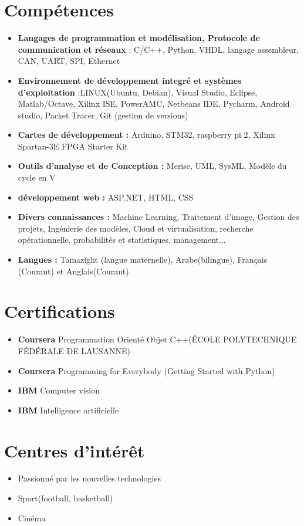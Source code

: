 \documentclass[letterpaper,9pt]{article}
\newcommand{\resumeItem}[2]{
  \item\small{
    {#1} { #2 \vspace{-2pt}}
  }
}
\newcommand{\resumeSubItem}[2]{\resumeItem{\textbf{#1}}{#2}\vspace{-4pt}}
\newcommand{\resumeSubHeadingListStart}{\begin{itemize}[leftmargin=*]}
\newcommand{\resumeSubHeadingListEnd}{\end{itemize}}
\begin{document}
\section{Compétences}
\color{black}
 \resumeSubHeadingListStart
   \resumeSubItem{Langages de programmation et modélisation, Protocole de communication et réseaux}
      { : C/C++, Python, VHDL, langage assembleur, CAN, UART, SPI, Ethernet}
      \resumeSubItem{Environnement de développement integré et systèmes d'exploitation}{:LINUX(Ubuntu, Debian),  Visual Studio, Eclipse, Matlab/Octave, Xilinx ISE, PowerAMC, Netbeans IDE, Pycharm, Android
studio, Packet Tracer, Git (gestion de versions)}
      \resumeSubItem{Cartes de développement :}{  Arduino, STM32, raspberry pi 2, Xilinx Spartan-3E FPGA Starter Kit }
      \resumeSubItem{Outils d’analyse et de Conception :}{ Merise, UML, SysML, Modèle du cycle en V}
      \resumeSubItem{développement web :}{ ASP.NET, HTML, CSS}
      \resumeSubItem{Divers connaissances :}{ Machine Learning, Traitement d’image, Gestion des projets, Ingénierie des modèles, Cloud et virtualisation, recherche opérationnelle, probabilités et statistiques, management...}
      \resumeSubItem{Langues :}{ Tamazight (langue maternelle), Arabe(bilingue), Français (Courant) et Anglais(Courant)}
\resumeSubHeadingListEnd 

\color{blue}
\section{Certifications}
\color{black}
\resumeSubHeadingListStart
\resumeSubItem{Coursera}{Programmation Orienté Objet C++(ÉCOLE POLYTECHNIQUE FÉDÉRALE DE LAUSANNE)}
\resumeSubItem{Coursera}{Programming for Everybody (Getting Started with Python)}
\resumeSubItem{IBM}{Computer vision}
\resumeSubItem{IBM}{Intelligence artificielle}
\resumeSubHeadingListEnd 


\color{blue}
\section{Centres d'intérêt}
\color{black}
\resumeSubHeadingListStart
\resumeSubItem{}{Passionné par les nouvelles technologies}
\resumeSubItem{}{Sport(football, basketball)}
\resumeSubItem{}{Cinéma}
\resumeSubHeadingListEnd 


\end{document}
